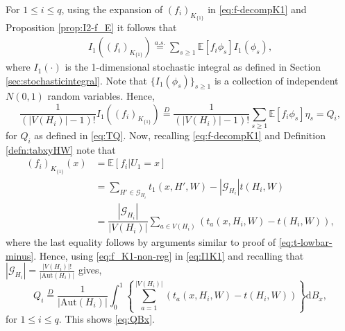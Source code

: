 \documentclass[11pt,reqno]{amsart}
\numberwithin{equation}{section}
\theoremstyle{definition}
\begin{document}
For $1 \leq i \leq q$, using the expansion of $(f_i)_{K_{\{ 1 \}}}$ in \eqref{eq:f-decompK1} and Proposition \ref{prop:I2-f_E} it follows that 
\begin{align}\label{eq:I1K1}
    I_1((f_{i})_{K_{\{1\}}}) \stackrel{a.s.} = \sum_{s \geq 1}\mathbb{E}\left[f_{i} \phi_{s}\right]I_1(\phi_{s}) ,  
\end{align}
where $I_1(\cdot)$ is the 1-dimensional stochastic integral as defined in Section \ref{sec:stochasticintegral}. Note that $\{I_1(\phi_s)\}_{s \geq 1}$ is a collection of independent $N(0, 1)$ random variables.  Hence,  
$$ \frac{1}{(|V(H_i)| - 1)!} I_1((f_{i})_{K_{\{1\}}}) \stackrel{D} = \frac{1}{(|V(H_i)| - 1)!}  \sum_{s \geq 1}\mathbb{E}\left[f_{i} \phi_{s}\right] \eta_s = Q_i ,$$
for $Q_i$ as defined in \eqref{eq:TQ}. 
Now, recalling \eqref{eq:f-decompK1} and Definition \ref{defn:tabxyHW} note that 
\begin{align}\label{eq:f_K1-non-reg}
    (f_{i})_{K_{\{1\}}}(x)
    &= \mathbb{E}\left[f_{i}|U_{1} = x\right] \nonumber\\
    &= \sum_{H'\in \mathscr{G}_{H_{i}}}t_{1}(x,H',W) - |\mathscr{G}_{H_{i}}|t(H_{i},W) \nonumber\\
    &= \dfrac{|\mathscr{G}_{H_{i}}|}{|V(H_{i})|}\sum_{a\in V(H_{i})}\left(t_{a}\left(x,H_{i},W\right) - t(H_{i},W)\right) , 
\end{align}
where the last equality follows by arguments similar to proof of \eqref{eq:t-lowbar-minus}. Hence, using \eqref{eq:f_K1-non-reg} in \eqref{eq:I1K1} and recalling that $|\mathscr{G}_{H_{i}}| = \frac{|V(H_{i})|!}{|\mathrm{Aut}(H_{i})|}$  gives, 
$$Q_i \stackrel{D} = \dfrac{1}{|\mathrm{Aut}(H_{i})|}  \int_{0}^{1} \left\{ \sum_{a=1}^{|V(H_{i})|} \left( t_{a}(x,H_{i},W) - t(H_{i},W) \right) \right\} \mathrm d B_{x} ,$$
for $1 \leq i \leq q$. This shows \eqref{eq:QBx}.
\end{document}
